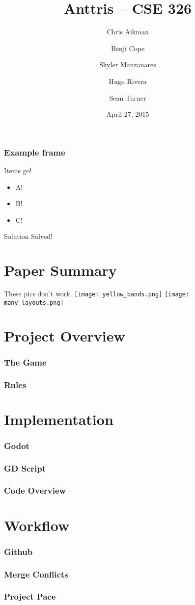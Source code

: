 \documentclass{beamer}
\title{Anttris -- CSE 326}
\author{%
\and Chris Aikman
\and Benji Cope
\and Skyler Manzanares
\and Hugo Rivera
\and Sean Turner}
\date{April 27, 2015}
\begin{document}
\begin{frame}
\titlepage
\end{frame}

\begin{frame}
    \frametitle{Example frame}
    Items go!
\begin{itemize}
\pause \item A!
\pause \item B!
\pause \item C!
\end{itemize}

\begin{alertblock}{Solution}
Solved!
\end{alertblock}

\end{frame}

\section{Paper Summary}
\begin{frame}
    These pics don't work.
\texttt{[image: yellow\_bands.png]}
\pause
\texttt{[image: many\_layouts.png]}
\end{frame}












\section{Project Overview}
\begin{frame}
    \frametitle{The Game}
\end{frame}

\begin{frame}
    \frametitle{Rules}
\end{frame}


\section{Implementation}
\begin{frame}
    \frametitle{Godot}
\end{frame}

\begin{frame}
    \frametitle{GD Script}
\end{frame}

\begin{frame}
    \frametitle{Code Overview}
\end{frame}


\section{Workflow}
\begin{frame}
    \frametitle{Github}
\end{frame}

\begin{frame}
    \frametitle{Merge Conflicts}
\end{frame}

\begin{frame}
    \frametitle{Project Pace}
\end{frame}
\end{document}
